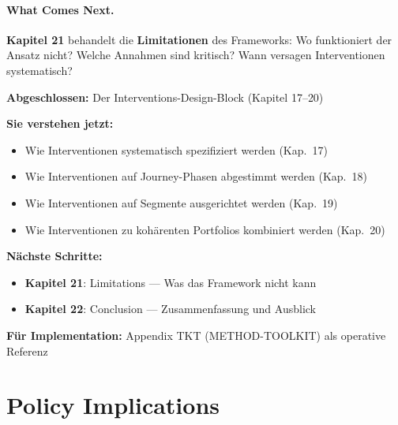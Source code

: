 \paragraph{What Comes Next.}
\textbf{Kapitel 21} behandelt die \textbf{Limitationen} des Frameworks: Wo funktioniert der Ansatz nicht? Welche Annahmen sind kritisch? Wann versagen Interventionen systematisch?



\begin{tcolorbox}[colback=gray!5!white, colframe=gray!75!black,
    title=Empfohlene Lesepfade]

\textbf{Abgeschlossen:} Der Interventions-Design-Block (Kapitel 17--20)

\textbf{Sie verstehen jetzt:}
\begin{itemize}[nosep]
\item Wie Interventionen systematisch spezifiziert werden (Kap.\ 17)
\item Wie Interventionen auf Journey-Phasen abgestimmt werden (Kap.\ 18)
\item Wie Interventionen auf Segmente ausgerichtet werden (Kap.\ 19)
\item Wie Interventionen zu kohärenten Portfolios kombiniert werden (Kap.\ 20)
\end{itemize}

\textbf{Nächste Schritte:}
\begin{itemize}[nosep]
\item \textbf{Kapitel 21}: Limitations --- Was das Framework nicht kann
\item \textbf{Kapitel 22}: Conclusion --- Zusammenfassung und Ausblick
\end{itemize}

\textbf{Für Implementation:} Appendix TKT (METHOD-TOOLKIT) als operative Referenz
\end{tcolorbox}



\section*{Policy Implications}

